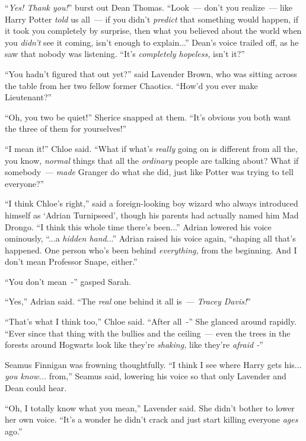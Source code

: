 ``\emph{Yes! Thank you!}'' burst out Dean Thomas. ``Look~--- don't you realize~--- like Harry Potter \emph{told} us all~--- if you didn't \emph{predict} that something would happen, if it took you completely by surprise, then what you believed about the world when you \emph{didn't} see it coming, isn't enough to explain...'' Dean's voice trailed off, as he saw that nobody was listening. ``It's \emph{completely hopeless,} isn't it?''

``You hadn't figured that out yet?'' said Lavender Brown, who was sitting across the table from her two fellow former Chaotics. ``How'd you ever make Lieutenant?''

``Oh, you two be quiet!'' Sherice snapped at them. ``It's obvious you both want the three of them for yourselves!''

``I mean it!'' Chloe said. ``What if what's \emph{really} going on is different from all the, you know, \emph{normal} things that all the \emph{ordinary} people are talking about? What if somebody~--- \emph{made} Granger do what she did, just like Potter was trying to tell everyone?''

``I think Chloe's right,'' said a foreign-looking boy wizard who always introduced himself as `Adrian Turnipseed', though his parents had actually named him Mad Drongo. ``I think this whole time there's been...'' Adrian lowered his voice ominously, ``...a \emph{hidden hand}...'' Adrian raised his voice again, ``shaping all that's happened. One person who's been behind \emph{everything,} from the beginning. And I don't mean Professor Snape, either.''

``You don't mean~-'' gasped Sarah.

``Yes,'' Adrian said. ``The \emph{real} one behind it all is~--- \emph{Tracey Davis!}''

``That's what I think too,'' Chloe said. ``After all~-'' She glanced around rapidly. ``Ever since that thing with the bullies and the ceiling~--- even the trees in the forests around Hogwarts look like they're \emph{shaking,} like they're \emph{afraid -}''

Seamus Finnigan was frowning thoughtfully. ``I think I see where Harry gets his... \emph{you know...} from,'' Seamus said, lowering his voice so that only Lavender and Dean could hear.

``Oh, I totally know what you mean,'' Lavender said. She didn't bother to lower her own voice. ``It's a wonder he didn't crack and just start killing everyone \emph{ages} ago.''

